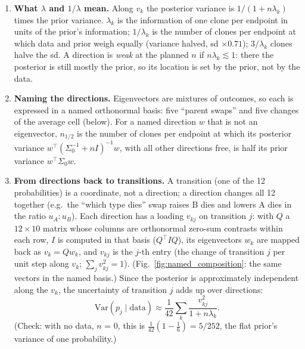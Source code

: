 \documentclass[10pt,a4paper]{article}
\begin{document}
\begin{keybox}
\begin{enumerate}
\item \textbf{What $\lambda$ and $1/\lambda$ mean.} Along $v_k$ the posterior variance is $1/(1 + n\lambda_k)$ times the prior variance. $\lambda_k$ is the information of one clone per endpoint in units of the prior's information; $1/\lambda_k$ is the number of clones per endpoint at which data and prior weigh equally (variance halved, sd $\times 0.71$); $3/\lambda_k$ clones halve the sd. A direction is \emph{weak} at the planned $n$ if $n\lambda_k \lesssim 1$: there the posterior is still mostly the prior, so its location is set by the prior, not by the data.
\item \textbf{Naming the directions.} Eigenvectors are mixtures of outcomes, so each is expressed in a named orthonormal basis: five ``parent swaps'' and five changes of the average cell (below). For a named direction $w$ that is not an eigenvector, $n_{1/2}$ is the number of clones per endpoint at which its posterior variance $w^\top(\Sigma_0^{-1} + nI)^{-1} w$, with all other directions free, is half its prior variance $w^\top \Sigma_0 w$.
\item \textbf{From directions back to transitions.} A transition (one of the 12 probabilities) is a coordinate, not a direction; a direction changes all 12 together (e.g.\ the ``which type dies'' swap raises B dies and lowers A dies in the ratio $u_A : u_B$). Each direction has a loading $v_{kj}$ on transition $j$: with $Q$ a $12\times10$ matrix whose columns are orthonormal zero-sum contrasts within each row, $I$ is computed in that basis ($Q^\top I Q$), its eigenvectors $w_k$ are mapped back as $v_k = Q w_k$, and $v_{kj}$ is the $j$-th entry (the change of transition $j$ per unit step along $v_k$; $\sum_j v_{kj}^2 = 1$). (Fig.~\ref{fig:named_composition}: the same vectors in the named basis.) Since the posterior is approximately independent along the $v_k$, the uncertainty of transition $j$ adds up over directions:
\[ \mathrm{Var}(p_j \mid \text{data}) \approx \frac{1}{42} \sum_k \frac{v_{kj}^2}{1 + n\lambda_k}. \] (Check: with no data, $n$ = 0, this is $\tfrac{1}{42}(1 - \tfrac16) = 5/252$, the flat prior's variance of one probability.)

\end{enumerate}
\end{keybox}
\end{document}
